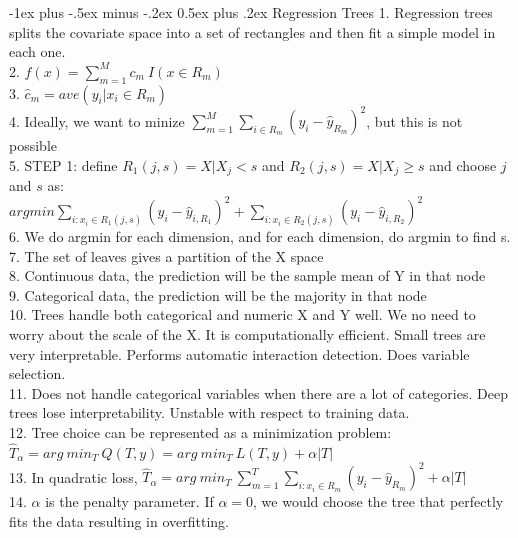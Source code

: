 \documentclass[10pt,landscape]{article}
\makeatletter
\renewcommand{\section}{\@startsection{section}{1}{0mm}%
                                {-1ex plus -.5ex minus -.2ex}%
                                {0.5ex plus .2ex}%
                                {\normalfont\large\bfseries}}
\makeatother
\begin{document}
\begin{multicols}{4}
\section{Regression Trees}
1. Regression trees splits the covariate space into a set of rectangles and then fit a simple model in each one.\\
2. $f(x) = \sum_{m=1}^M c_m\ I(x\in R_m)$\\
3. $\hat{c}_m = ave(y_i | x_i\in R_m)$\\
4. Ideally, we want to minize $\sum_{m=1}^M \sum_{i\in R_m} (y_i - \hat{y}_{R_m})^2$, but this is not possible\\
5. STEP 1: define $R_1(j,s) = {X|X_j < s}$ and $R_2(j,s) = {X|X_j \geq s}$ and choose $j$ and $s$ as:\\
$argmin \sum_{i:x_i\in R_1(j,s)}(y_i - \hat{y}_{i,R_1})^2 + \sum_{i:x_i\in R_2(j,s)}(y_i - \hat{y}_{i,R_2})^2$\\
6. We do argmin for each dimension, and for each dimension, do argmin to find s.\\
7. The set of leaves gives a partition of the X space\\
8. Continuous data, the prediction will be the sample mean of Y in that node\\
9. Categorical data, the prediction will be the majority in that node\\
10. Trees handle both categorical and numeric X and Y well. We no need to worry about the scale of the X. It is computationally efficient. Small trees are very interpretable. Performs automatic interaction detection. Does variable selection.\\
11. Does not handle categorical variables when there are a lot of categories. Deep trees lose interpretability. Unstable with respect to training data.\\
12. Tree choice can be represented as a minimization problem:\\
$\hat{T}_\alpha = arg\ min_T\ Q(T,y) = arg\ min_T\ L(T,y) + \alpha |T|$\\
13. In quadratic loss, 
$\hat{T}_\alpha = arg\ min_T\ \sum_{m=1}^{T} \sum_{i:x_i\in R_m}(y_i - \hat{y}_{R_m})^2 + \alpha |T|$\\
14. $\alpha$ is the penalty parameter. If $\alpha=0$, we would choose the tree that perfectly fits the data resulting in overfitting.\\


\end{multicols}
\end{document}
